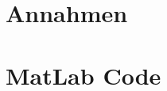 \newcommand{\waInputStyles}{\texttt{se-wa-input-styles-v097.tex}}

\chapter{Annahmen}
\chapter{MatLab Code}